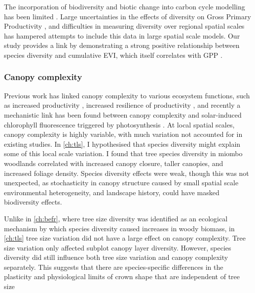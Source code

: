 \begin{refsection}
The incorporation of biodiversity and biotic change into carbon cycle modelling has been limited \citep{Ahlstrom2015, Bodegom2011}. Large uncertainties in the effects of diversity on Gross Primary Productivity \citep{}, and difficulties in measuring diversity over regional spatial scales has hampered attempts to include this data in large spatial scale models. Our study provides a link by demonstrating a strong positive relationship between species diversity and cumulative EVI, which itself correlates with GPP \citep{Sjostrom2011}.

\subsubsection{Canopy complexity}
\label{discussion:sssec:canopy}

Previous work has linked canopy complexity to various ecosystem functions, such as increased productivity \citep{Gough2019, Hardiman2011}, increased resilience of productivity \citep{Pretzsch2014}, and recently a mechanistic link has been found between canopy complexity and solar-induced chlorophyll fluorescence triggered by photosynthesis \citep{Regaieg2021}. At local spatial scales, canopy complexity is highly variable, with much variation not accounted for in existing studies. In \autoref{ch:tls}, I hypothesised that species diversity might explain some of this local scale variation. I found that tree species diversity in miombo woodlands correlated with increased canopy closure, taller canopies, and increased foliage density. Species diversity effects were weak, though this was not unexpected, as stochasticity in canopy structure caused by small spatial scale environmental heterogeneity, and landscape history, could have masked biodiversity effects.

Unlike in \autoref{ch:befr}, where tree size diversity was identified as an ecological mechanism by which species diversity caused increases in woody biomass, in \autoref{ch:tls} tree size variation did not have a large effect on canopy complexity. Tree size variation only affected subplot canopy layer diversity. However, species diversity did still influence both tree size variation and canopy complexity separately. This suggests that there are species-specific differences in the plasticity and physiological limits of crown shape that are independent of tree size


\end{refsection}
